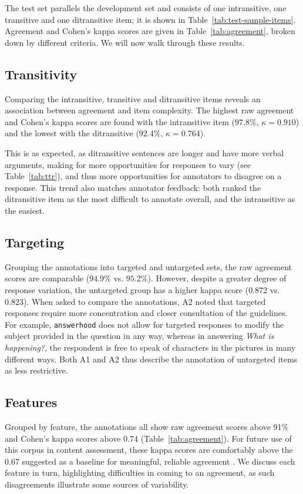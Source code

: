 \documentclass[11pt,a4paper]{article}
\newcommand{\feat}[1]{\texttt{#1}}
\newcommand{\md}[1]{\marginpar{\scriptsize MD: #1}}
\begin{document}
The test set parallels the development set and consists of one intransitive, one transitive and one ditransitive item; it is shown in Table~\ref{tab:test-sample-items}. Agreement and Cohen's kappa scores are given in Table~\ref{tab:agreement}, broken down by different criteria.  We will now walk through these results.

\subsection{Transitivity} 
\label{sec:transitivity}
Comparing the intransitive, transitive and ditransitive items reveals an association between agreement and item complexity. The highest raw agreement and Cohen's kappa scores are found with the intransitive item ($97.8\%$, $\kappa=0.910$) and the lowest with the ditransitive ($92.4\%$, $\kappa=0.764$). 

This is as expected, as ditransitive sentences are longer and have more verbal arguments, making for more opportunities for responses to vary (see Table~\ref{tab:ttr}), and thus more opportunities for annotators to disagree on a response. This trend also matches annotator feedback: both ranked the ditransitive item as the most difficult to annotate overall, and the intransitive as the easiest.

\subsection{Targeting} 
\label{sec:prompts}
Grouping the annotations into targeted and untargeted sets, the raw agreement scores are comparable ($94.9\%$ vs. $95.2\%$). However, despite a greater degree of response variation, the untargeted group has a higher kappa score ($0.872$ vs. $0.823$).
%
%
When asked to compare the annotations, A2 noted that targeted responses require more concentration and closer consultation of the guidelines. For example, \feat{answerhood} does not allow for targeted responses to modify the subject provided in the question in any way, whereas in answering \textit{What is happening?}, the respondent is free to speak of characters in the pictures in many different ways.  Both A1 and A2 thus describe the annotation of untargeted items as less restrictive.

\subsection{Features} 
\label{sec:features}
Grouped by feature, the annotations all show raw agreement scores above 91\% and Cohen's kappa scores above 0.74 (Table~\ref{tab:agreement}). For future use of this corpus in content assessment, these kappa scores are comfortably above the 0.67 suggested as a baseline for meaningful, reliable agreement \citep{landis1977measurement, artstein:massimo:2008}.  We discuss each feature in turn, highlighting difficulties in coming to an agreement, as such disagreements illustrate some sources of variability.
\end{document}
